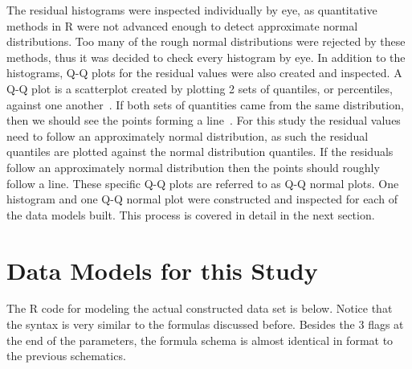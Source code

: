 The residual histograms were inspected individually by eye, as quantitative methods in R were not advanced enough to detect approximate normal distributions. Too many of the rough normal distributions were rejected by these methods, thus it was decided to check every histogram by eye. In addition to the histograms, Q-Q plots for the residual values were also created and inspected. A Q-Q plot is a scatterplot created by plotting 2 sets of quantiles, or percentiles, against one another~\cite{QQPlots:online}. If both sets of quantities came from the same distribution, then we should see the points forming a line~\cite{QQPlots:online}. For this study the residual values need to follow an approximately normal distribution, as such the residual quantiles are plotted against the normal distribution quantiles. If the residuals follow an approximately normal distribution then the points should roughly follow a line. These specific Q-Q plots are referred to as Q-Q normal plots. One histogram and one Q-Q normal plot were constructed and inspected for each of the data models built. This process is covered in detail in the next section.


\section{Data Models for this Study}



\lstset{style=mystyle}

The R code for modeling the actual constructed data set is below. Notice that the syntax is very similar to the formulas discussed before. Besides the 3 flags at the end of the parameters, the formula schema is almost identical in format to the previous schematics.    

